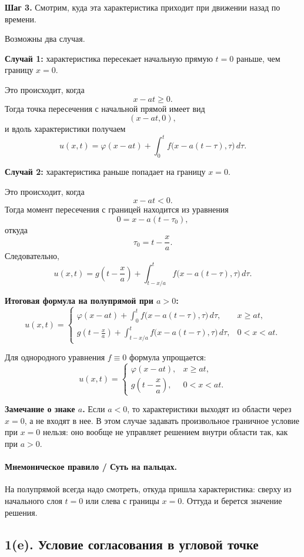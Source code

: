 \documentclass[a4paper,12pt]{article}
\begin{document}
\textbf{Шаг 3.} Смотрим, куда эта характеристика приходит при движении назад по времени.

Возможны два случая.

\textbf{Случай 1:} характеристика пересекает начальную прямую $t=0$ раньше, чем границу $x=0$.

Это происходит, когда
\[
x-at\ge 0.
\]
Тогда точка пересечения с начальной прямой имеет вид
\[
(x-at,0),
\]
и вдоль характеристики получаем
\[
u(x,t)=\varphi(x-at)+\int_0^t f\bigl(x-a(t-\tau),\tau\bigr)\,d\tau.
\]

\textbf{Случай 2:} характеристика раньше попадает на границу $x=0$.

Это происходит, когда
\[
x-at<0.
\]
Тогда момент пересечения с границей находится из уравнения
\[
0=x-a(t-\tau_0),
\]
откуда
\[
\tau_0=t-\frac{x}{a}.
\]
Следовательно,
\[
u(x,t)=g\!\left(t-\frac{x}{a}\right)+\int_{t-x/a}^t f\bigl(x-a(t-\tau),\tau\bigr)\,d\tau.
\]

\textbf{Итоговая формула на полупрямой при $a>0$:}
\[
u(x,t)=
\begin{cases}
\displaystyle
\varphi(x-at)+\int_0^t f\bigl(x-a(t-\tau),\tau\bigr)\,d\tau,
& x\ge at,
\\[1.2em]
\displaystyle
g\!\left(t-\frac{x}{a}\right)+\int_{t-x/a}^t f\bigl(x-a(t-\tau),\tau\bigr)\,d\tau,
& 0<x<at.
\end{cases}
\]

Для однородного уравнения $f\equiv 0$ формула упрощается:
\[
u(x,t)=
\begin{cases}
\varphi(x-at), & x\ge at,
\\[0.4em]
g\!\left(t-\dfrac{x}{a}\right), & 0<x<at.
\end{cases}
\]

\textbf{Замечание о знаке $a$.} Если $a<0$, то характеристики выходят из области через $x=0$, а не входят в нее. В этом случае задавать произвольное граничное условие при $x=0$ нельзя: оно вообще не управляет решением внутри области так, как при $a>0$.

\paragraph{Мнемоническое правило / Суть на пальцах.}
На полупрямой всегда надо смотреть, откуда пришла характеристика: сверху из начального слоя $t=0$ или слева с границы $x=0$. Оттуда и берется значение решения.

\subsection*{1(e). Условие согласования в угловой точке}
\end{document}
